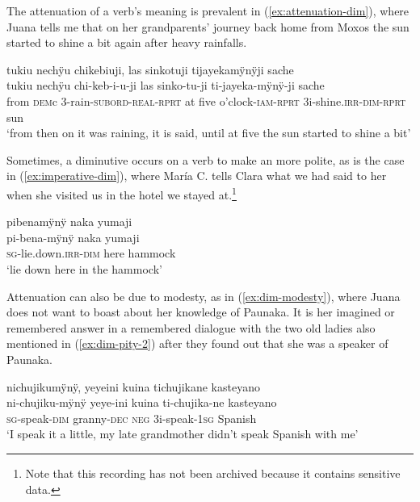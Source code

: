 The attenuation of a verb’s meaning is prevalent in (\ref{ex:attenuation-dim}), where Juana tells me that on her grandparents’ journey back home from Moxos  the sun started to shine a bit again after heavy rainfalls.

\ea\label{ex:attenuation-dim}
\begingl 
\glpreamble tukiu nechÿu chikebiuji, las sinkotuji tijayekamÿnÿji sache\\
\gla tukiu nechÿu chi-keb-i-u-ji {las sinko}-tu-ji ti-jayeka-mÿnÿ-ji sache\\ 
\glb from \textsc{dem}c 3-rain-\textsc{subord}-\textsc{real}-\textsc{rprt} {at five o’clock}-\textsc{iam}-\textsc{rprt} 3i-shine.\textsc{irr}-\textsc{dim}-\textsc{rprt} sun\\ 
\glft ‘from then on it was raining, it is said, until at five the sun started to shine a bit’
\trailingcitation{[jxx-p151016l-2.122]}
\xe

Sometimes, a diminutive occurs on a verb to make an  more polite, as is the case in (\ref{ex:imperative-dim}), where María C. tells Clara what we had said to her when she visited us in the hotel we stayed at.\footnote{Note that this recording has not been archived because it contains sensitive data.}

\ea\label{ex:imperative-dim}
\begingl
\glpreamble pibenamÿnÿ naka yumaji\\
\gla pi-bena-mÿnÿ naka yumaji\\
\textsc{sg}-lie.down.\textsc{irr}-\textsc{dim} here hammock\\
\glft ‘lie down here in the hammock’
\endgl
\trailingcitation{[cux-c120510l-1.141]}
\xe

Attenuation can also be due to modesty, as in (\ref{ex:dim-modesty}), where Juana does not want to boast about her knowledge of Paunaka. It is her imagined or remembered answer in a remembered dialogue with the two old ladies also mentioned in (\ref{ex:dim-pity-2}) after they found out that she was a speaker of Paunaka.

\ea\label{ex:dim-modesty}
\begingl 
\glpreamble nichujikumÿnÿ, yeyeini kuina tichujikane kasteyano\\
\gla ni-chujiku-mÿnÿ yeye-ini kuina ti-chujika-ne kasteyano\\ 
\textsc{sg}-speak-\textsc{dim} granny-\textsc{dec} \textsc{neg} 3i-speak-1\textsc{sg} Spanish\\ 
\glft ‘I speak it a little, my late grandmother didn’t speak Spanish with me’
\trailingcitation{[jxx-p120515l-1.166]}
\xe



